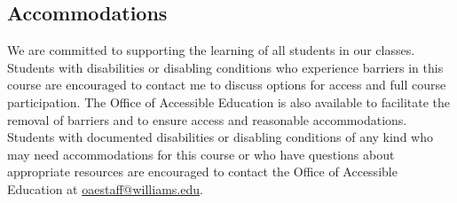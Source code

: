 \documentclass[11pt]{article}
\begin{document}
\subsection{Accommodations}
We are committed to supporting the learning of all students in our classes. Students with disabilities or disabling conditions who experience barriers in this course are encouraged to
contact me to discuss options for access and full course participation. The Office of Accessible Education is also available to facilitate the removal of barriers and to ensure access and reasonable accommodations. Students with documented disabilities or disabling conditions of any kind who may need accommodations
for this course or who have questions about appropriate resources are encouraged to contact the Office of Accessible Education at \url{oaestaff@williams.edu}.
\end{document}
